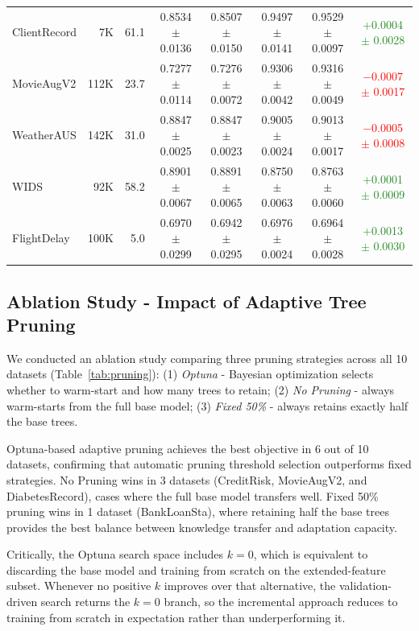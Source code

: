 \documentclass[sigconf]{acmart}
\begin{document}
\begin{itemize}
\begin{table}[!t]
{\begin{tabular}{l r r c c c c c}
ClientRecord           & 7K   & 61.1 & 0.8534 $\pm$ 0.0136 & 0.8507 $\pm$ 0.0150 & 0.9497 $\pm$ 0.0141 & 0.9529 $\pm$ 0.0097 & \textcolor{ForestGreen}{+0.0004 $\pm$ 0.0028} \\
MovieAugV2             & 112K & 23.7 & 0.7277 $\pm$ 0.0114 & 0.7276 $\pm$ 0.0072 & 0.9306 $\pm$ 0.0042 & 0.9316 $\pm$ 0.0049 & \textcolor{red}{$-$0.0007 $\pm$ 0.0017} \\
WeatherAUS             & 142K & 31.0 & 0.8847 $\pm$ 0.0025 & 0.8847 $\pm$ 0.0023 & 0.9005 $\pm$ 0.0024 & 0.9013 $\pm$ 0.0017 & \textcolor{red}{$-$0.0005 $\pm$ 0.0008} \\
WIDS                   & 92K  & 58.2 & 0.8901 $\pm$ 0.0067 & 0.8891 $\pm$ 0.0065 & 0.8750 $\pm$ 0.0063 & 0.8763 $\pm$ 0.0060 & \textcolor{ForestGreen}{+0.0001 $\pm$ 0.0009} \\
FlightDelay            & 100K & 5.0  & 0.6970 $\pm$ 0.0299 & 0.6942 $\pm$ 0.0295 & 0.6976 $\pm$ 0.0024 & 0.6964 $\pm$ 0.0028 & \textcolor{ForestGreen}{+0.0013 $\pm$ 0.0030} \\
\bottomrule
\end{tabular}%
}

\end{table}

\subsection{Ablation Study - Impact of Adaptive Tree Pruning}

We conducted an ablation study comparing three pruning strategies across all 10 datasets (Table~\ref{tab:pruning}): (1) \textit{Optuna} - Bayesian optimization selects whether to warm-start and how many trees to retain; (2) \textit{No Pruning} - always warm-starts from the full base model; (3) \textit{Fixed 50\%} - always retains exactly half the base trees.

Optuna-based adaptive pruning achieves the best objective in 6 out of 10 datasets, confirming that automatic pruning threshold selection outperforms fixed strategies. No Pruning wins in 3 datasets (CreditRisk, MovieAugV2, and DiabetesRecord), cases where the full base model transfers well. Fixed 50\% pruning wins in 1 dataset (BankLoanSta), where retaining half the base trees provides the best balance between knowledge transfer and adaptation capacity.

Critically, the Optuna search space includes $k=0$, which is equivalent to discarding the base model and training from scratch on the extended-feature subset. Whenever no positive $k$ improves over that alternative, the validation-driven search returns the $k=0$ branch, so the incremental approach reduces to training from scratch in expectation rather than underperforming it.


\end{itemize}
\end{document}
